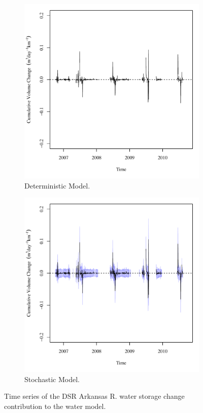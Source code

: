 \begin{linenumbers}
\begin{figure}[htbp]
\centering
	\begin{subfigure}{0.5\textwidth}
		\centering
		\includegraphics[width=0.9\linewidth]{"Figures/Results_DDSR/Balance Water - storage"}
		\caption{Deterministic Model.}
		\label{sub:DSRWaterStoreD}
	\end{subfigure}%
	\begin{subfigure}{0.5\textwidth}
		\centering
		\includegraphics[width=0.9\linewidth]{"Figures/Results_DSR/Balance Water - storage"}
		\caption{Stochastic Model.}
		\label{sub:DSRWaterStoreS}
	\end{subfigure}
	\caption[Time series of the DSR Arkansas R. water storage change contribution to the water model.]{Time series of the DSR Arkansas R. water storage change contribution to the water model.}
	\label{fig:DSRWaterStore}
\end{figure}


\end{linenumbers}
